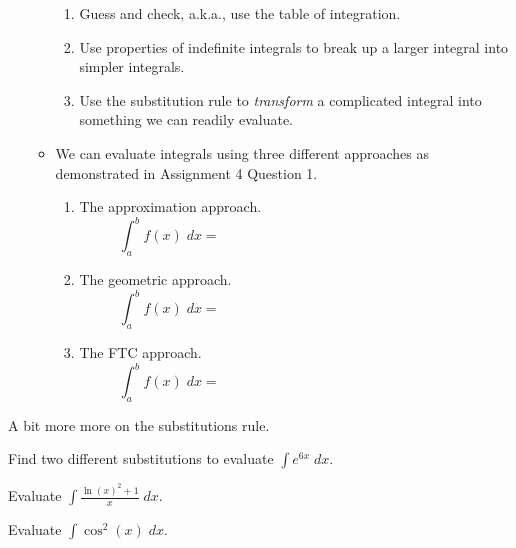 \documentclass[../main.tex]{subfiles}
\begin{document}
\begin{enumerate}[wide, label=\textbf{Part~\arabic*}.]
\begin{itemize}
          \begin{enumerate}
            \item Guess and check, a.k.a., use the table of integration. 
            \item Use properties of indefinite integrals to break up a larger integral into simpler integrals. 
            \item Use the substitution rule to \emph{transform} a complicated integral into something we can readily evaluate.
          \end{enumerate}

        \item We can evaluate integrals using three different approaches as demonstrated in Assignment 4 Question 1.

          \begin{enumerate}
            \item The approximation approach. 
              \[
                \int_{a}^{b} f(x) \;dx = \hspace{3in}
              \]

            \item The geometric approach. 
              \[
                \int_{a}^{b} f(x) \;dx = \hspace{3in}
              \]

            \item The FTC approach. 
              \[
                \int_{a}^{b} f(x) \;dx = \hspace{3in}
              \]
          \end{enumerate}
      \end{itemize}
  \end{enumerate}

  \clearpage
  A bit more more on the substitutions rule. 

  \begin{example}
    Find two different substitutions to evaluate \(\int e^{6x} \;dx\).
  \end{example}

  \begin{example}
    Evaluate \(\int \frac{\ln(x)^{2} + 1}{x} \;dx\).
  \end{example}

  \begin{example}
    Evaluate \(\int \cos^{2}(x) \;dx\).
  \end{example}
\end{document}

